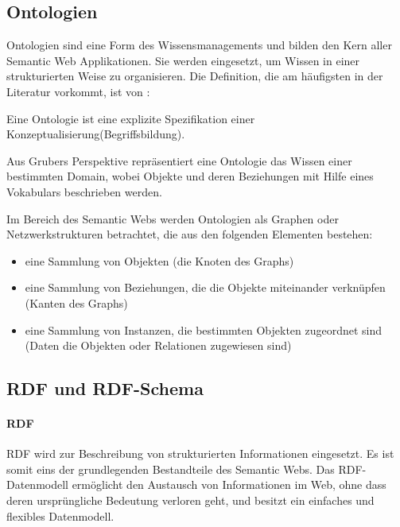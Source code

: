 \clearpage

\subsection{Ontologien}

Ontologien sind eine Form des Wissensmanagements und bilden den Kern aller Semantic Web Applikationen. 
Sie werden eingesetzt, um Wissen in einer strukturierten Weise zu organisieren.
Die Definition, die am häufigsten in der Literatur vorkommt, ist von \citet{gruber_translation_1993}:

\begin{definition}
  Eine Ontologie ist eine explizite Spezifikation einer Konzeptualisierung(Begriffsbildung).
\end{definition}

\noindent Aus Grubers Perspektive repräsentiert eine Ontologie das Wissen einer bestimmten Domain, wobei Objekte und deren Beziehungen mit Hilfe eines Vokabulars beschrieben werden. \citep[vgl.]{breitman_semantic_2007}

Im Bereich des Semantic Webs werden Ontologien als Graphen oder Netzwerkstrukturen betrachtet, die aus den folgenden Elementen bestehen:

\begin{itemize}
	\item eine Sammlung von Objekten (die Knoten des Graphs)
	\item eine Sammlung von Beziehungen, die die Objekte miteinander verknüpfen (Kanten des Graphs)
	\item eine Sammlung von Instanzen, die bestimmten Objekten zugeordnet sind (Daten die Objekten oder Relationen zugewiesen sind) \citep[vgl.]{davies_semantic_2006}
\end{itemize}

\subsection{RDF und RDF-Schema} 

\paragraph{RDF}

\ac{RDF} wird zur Beschreibung von strukturierten Informationen eingesetzt. 
Es ist somit eins der grundlegenden Bestandteile des Semantic Webs.
Das \ac{RDF}-Datenmodell ermöglicht den Austausch von Informationen im Web, ohne dass deren ursprüngliche Bedeutung verloren geht, und besitzt ein einfaches und flexibles Datenmodell. \citep[vgl.]{linkeddatavisualization}

